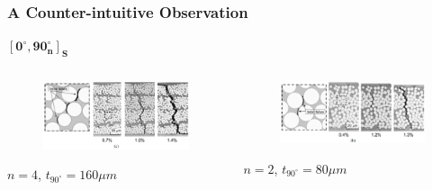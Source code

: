 \documentclass[first,firstsupp,lastsupp,last,hyperref,table]{ETHclass}
\begin{document}
\addtocounter{framenumber}{-1}

\begin{frame}
\frametitle{\vspace{0.3cm}\small A Counter-intuitive Observation}
\vspace{-0.5cm}
\centering
\tiny
$\mathbf{\left[0^{\circ}, 90^{\circ}_{n}\right]_{S}}$
\vspace{-0.25cm}
\begin{columns}[c]
\begin{column}{0.5\textwidth}
\centering
\begin{figure}
\centering
\includegraphics[width=\columnwidth]{saito-thick.png}
\end{figure}
\vspace{-0.4cm}
$n=4$, $t_{90^{\circ}}=160\mu m$
\end{column}
\begin{column}{0.5\textwidth}
\centering
\begin{figure}
\centering
\includegraphics[width=\columnwidth]{saito-mid.png}
\end{figure}
\vspace{-0.4cm}
$n=2$, $t_{90^{\circ}}=80\mu m$
\end{column}
\end{columns}
\vspace{-0.1cm}
\centering
\begin{figure}

\end{figure}
\end{frame}
\end{document}
